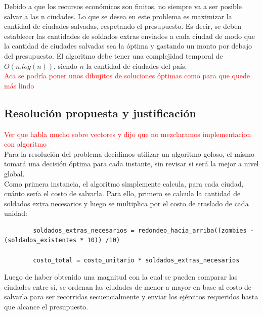 \documentclass[a4paper]{article}
\begin{document}
Debido a que los recursos econ\'omicos son finitos, no siempre va a ser posible salvar a las n ciudades. Lo que se desea en este problema es maximizar la cantidad de ciudades salvadas, respetando el presupuesto. Es decir, se deben establecer las cantidades de soldados extras enviados a cada ciudad de modo que la cantidad de ciudades salvadas sea la \'optima y gastando un monto por debajo del presupuesto.  El algoritmo debe tener una complejidad temporal de $O(n.log(n))$, siendo $n$ la cantidad de ciudades del pa\'is.\\

\textcolor{red}{Aca se podr\'ia poner unos dibujitos de soluciones \'optimas como para que quede m\'as lindo}


\newpage
\subsection{Resoluci\'on propuesta y justificaci\'on}

\textcolor{red}{Ver que habla mucho sobre vectores y dijo que no mezclaramos implementacion con algoritmo}\\

Para la resoluci\'on del problema decidimos utilizar un algoritmo goloso, el mismo tomar\'a una decisi\'on \'optima para cada instante, sin revisar si ser\'a la mejor a nivel global.\\

Como primera instancia, el algoritmo simplemente calcula, para cada ciudad, cu\'anto ser\'ia el costo de salvarla. Para ello, primero se calcula la cantidad de soldados extra necesarios y luego se multiplica por el costo de traslado de cada unidad:\\


	\begin{codesnippet}
	\begin{verbatim}
		soldados_extras_necesarios = redondeo_hacia_arriba((zombies - (soldados_existentes * 10)) /10)
		
		costo_total = costo_unitario * soldados_extras_necesarios
	\end{verbatim}
	\end{codesnippet}

Luego de haber obtenido una magnitud con la cual se pueden comparar las ciudades entre s\'i, se ordenan las ciudades de menor a mayor en base al costo de salvarla para ser recorridas secuencialmente y enviar los ej\'ercitos requeridos hasta que alcance el presupuesto.\\
\end{document}
